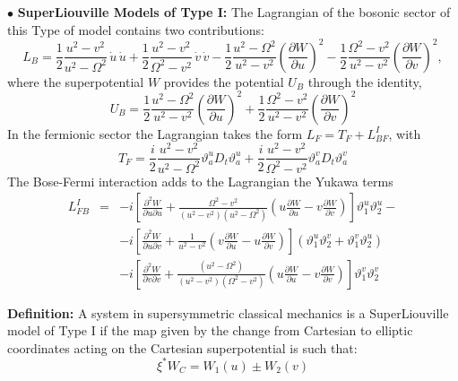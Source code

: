 \documentclass[a4paper,11pt,twoside]{article}
\begin{document}
\noindent $\bullet$ {\bf  SuperLiouville Models of Type I:} The
Lagrangian of the bosonic sector of this Type of model contains
two contributions:
\[
L_B =\displaystyle\frac{1}{2}
\displaystyle\frac{u^2-v^2}{u^2-\Omega^2} \, \dot{u} \, \dot{u} +
\displaystyle\frac{1}{2} \displaystyle\frac{u^2-v^2}{\Omega^2-v^2}
\, \dot{v} \, \dot{v}- \displaystyle\frac{1}{2}
\displaystyle\frac{u^2-\Omega^2}{u^2-v^2} \left(
\displaystyle\frac{\partial W}{\partial u}
\right)^2-\displaystyle\frac{1}{2}
\displaystyle\frac{\Omega^2-v^2}{u^2-v^2} \left(
\displaystyle\frac{\partial W}{\partial v} \right)^2 ,
 \]
where the superpotential $W$ provides the potential $U_B$ through
the identity,
\[
U_{B}= \displaystyle\frac{1}{2} \displaystyle\frac{u^2-\Omega^2}{u^2-v^2} \left( \displaystyle\frac{\partial W}{\partial u} \right)^2+\displaystyle\frac{1}{2} \displaystyle\frac{\Omega^2-v^2}{u^2-v^2} \left( \displaystyle\frac{\partial W}{\partial v} \right)^2
\]
In the fermionic sector the Lagrangian takes the form
$L_F=T_F+L_{BF}^I$, with
\[
T_F=\frac{i}{2} \frac{u^2-v^2}{u^2-\Omega^2}
\vartheta_a^u D_t \vartheta_a^u+ \frac{i}{2}
\frac{u^2-v^2}{\Omega^2-v^2} \vartheta_a^v D_t \vartheta_a^v
\]
The Bose-Fermi interaction adds to the Lagrangian the Yukawa terms
\begin{eqnarray*}
L_{FB}^I & =& -i \left[ \frac{\partial^2 W}{\partial u \partial u}+\displaystyle\frac{\Omega^2-v^2}{(u^2-v^2)(u^2-\Omega^2)}\left(u \frac{\partial W}{\partial u} -v \frac{\partial W}{\partial v} \right)  \right] \vartheta_1^u \vartheta_2^u- \\ & & -i \left[ \frac{\partial^2 W}{\partial u \partial v} +\displaystyle\frac{1}{u^2-v^2} \left( v \frac{\partial W}{\partial u}-u \frac{\partial W}{\partial v} \right) \right] (\vartheta_1^u \vartheta_2^v+\vartheta_1^v \vartheta_2^u) \\ & &  -i \left[ \frac{\partial^2 W}{\partial v \partial v} +\displaystyle\frac{(u^2-\Omega^2)}{(u^2-v^2)(\Omega^2-v^2)} \left(u \frac{\partial W}{\partial u} -v \frac{\partial W}{\partial v} \right) \right] \vartheta_1^v \vartheta_2^v
\end{eqnarray*}

{\bf Definition:} A system in supersymmetric classical mechanics
is a SuperLiouville model of Type I if the map given by the change
from Cartesian to elliptic coordinates acting on the Cartesian
superpotential is such that:
\[
\xi^{*} W_C=W_1(u)\pm W_2(v)
\]

\vspace*{0.1cm}
\end{document}
